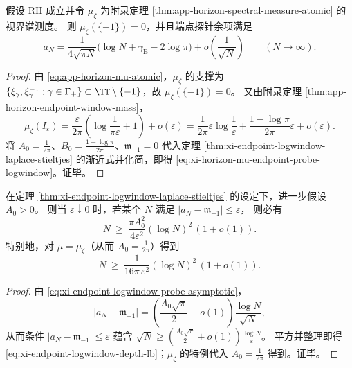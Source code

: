 \begin{corollary}[视界谱测度的端点探针常数项]\label{cor:xi-horizon-mu-endpoint-probe-constant}
假设 RH 成立并令 \(\mu_{\zeta}\) 为附录定理 \ref{thm:app-horizon-spectral-measure-atomic} 的视界谱测度。
则 \(\mu_{\zeta}(\{-1\})=0\)，并且端点探针余项满足
\begin{equation}\label{eq:xi-horizon-mu-endpoint-probe-logwindow}
\boxed{\;
a_N
=\frac{1}{4\sqrt{\pi N}}\bigl(\log N+\gamma_{\mathrm E}-2\log\pi\bigr)
+o\!\left(\frac{1}{\sqrt N}\right)\qquad(N\to\infty).\;}
\end{equation}
\end{corollary}
\begin{proof}
由 \eqref{eq:app-horizon-mu-atomic}，\(\mu_{\zeta}\) 的支撑为 \(\{\xi_{\gamma},\xi_{\gamma}^{-1}:\gamma\in\Gamma_+\}\subset\TT\setminus\{-1\}\)，故 \(\mu_{\zeta}(\{-1\})=0\)。
又由附录定理 \ref{thm:app-horizon-endpoint-window-mass}，
\[
\mu_{\zeta}(I_{\varepsilon})
=\frac{\varepsilon}{2\pi}\left(\log\frac{1}{\pi\varepsilon}+1\right)+o(\varepsilon)
=\frac{1}{2\pi}\varepsilon\log\frac{1}{\varepsilon}+\frac{1-\log\pi}{2\pi}\varepsilon+o(\varepsilon).
\]
将 \(A_0=\frac{1}{2\pi}\)、\(B_0=\frac{1-\log\pi}{2\pi}\)、\(\mathfrak m_{-1}=0\) 代入定理 \ref{thm:xi-endpoint-logwindow-laplace-stieltjes} 的渐近式并化简，即得 \eqref{eq:xi-horizon-mu-endpoint-probe-logwindow}。证毕。
\end{proof}

\begin{proposition}[对数端点窗诱导的深度下界]\label{prop:xi-endpoint-logwindow-depth-lower-bound}
在定理 \ref{thm:xi-endpoint-logwindow-laplace-stieltjes} 的设定下，进一步假设 \(A_0>0\)。
则当 \(\varepsilon\downarrow 0\) 时，若某个 \(N\) 满足
\(
|a_N-\mathfrak m_{-1}|\le \varepsilon
\)，
则必有
\begin{equation}\label{eq:xi-endpoint-logwindow-depth-lb}
N\ \ge\ \frac{\pi A_0^{2}}{4\varepsilon^{2}}(\log N)^{2}\,(1+o(1)).
\end{equation}
特别地，对 \(\mu=\mu_{\zeta}\)（从而 \(A_0=\frac{1}{2\pi}\)）得到
\[
N\ \ge\ \frac{1}{16\pi\,\varepsilon^{2}}(\log N)^{2}\,(1+o(1)).
\]
\end{proposition}
\begin{proof}
由 \eqref{eq:xi-endpoint-logwindow-probe-asymptotic}，
\[
|a_N-\mathfrak m_{-1}|
=\left(\frac{A_0\sqrt{\pi}}{2}+o(1)\right)\frac{\log N}{\sqrt N},
\]
从而条件 \(|a_N-\mathfrak m_{-1}|\le \varepsilon\) 蕴含
\(
\sqrt N\ge \left(\frac{A_0\sqrt{\pi}}{2}+o(1)\right)\frac{\log N}{\varepsilon}
\)。
平方并整理即得 \eqref{eq:xi-endpoint-logwindow-depth-lb}；\(\mu_{\zeta}\) 的特例代入 \(A_0=\frac{1}{2\pi}\) 得到。证毕。
\end{proof}

